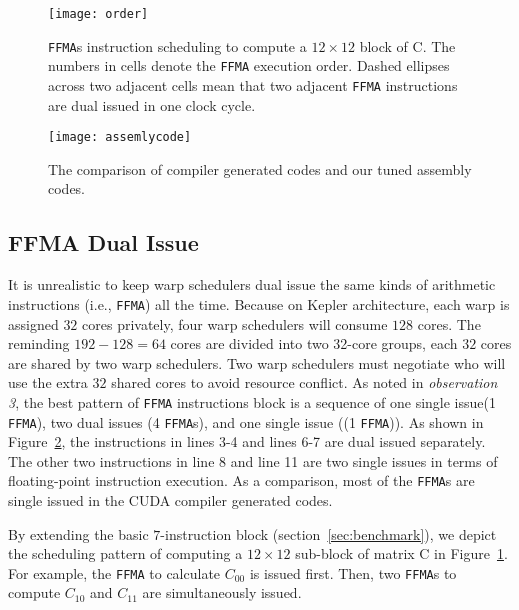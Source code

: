 \begin{figure}[htbp]
\begin{center}
\texttt{[image: order]}
\caption{\small {\tt FFMA}s instruction scheduling to compute a $12\times 12$ block of C.  The numbers in
cells denote the {\tt FFMA} execution order. Dashed ellipses across two adjacent cells mean that two adjacent {\tt FFMA} instructions are dual issued in one clock cycle.}
\label{fig:order}
\end{center}
\end{figure}

\begin{figure}[htbp]
\begin{center}
\texttt{[image: assemlycode]}
    \caption{\small The comparison of compiler generated codes and our tuned assembly codes.}
\label{fig:assemblycode}
\end{center}
\end{figure}
\subsection{FFMA Dual Issue}
\label{sec:ffma-dual}

It is unrealistic to keep warp schedulers dual issue the same kinds of arithmetic instructions (i.e., {\tt FFMA}) all
the time. Because on Kepler architecture, each warp is assigned $32$ cores privately, four warp schedulers will consume
$128$ cores. The reminding $192-128=64$ cores are divided into two 32-core groups, each $32$ cores
are shared by two warp schedulers. Two warp schedulers must negotiate who will use the extra $32$ shared cores to avoid
resource conflict.
As noted in {\em observation 3}, the best pattern of {\tt FFMA} instructions block is a sequence of one single issue(1
{\tt FFMA}), two dual issues (4 {\tt FFMA}s), and one single issue ((1 {\tt FFMA})). As shown in
Figure~\ref{fig:assemblycode}, the instructions in lines 3-4 and lines 6-7 are dual issued separately.
The other two instructions in line 8 and line 11 are two single issues in terms of floating-point instruction
execution.
As a comparison, most of the {\tt FFMA}s are single issued in the CUDA compiler generated codes.

By extending the basic $7$-instruction block (section~\ref{sec:benchmark}), we depict the scheduling pattern of computing a $12\times 12$ sub-block of matrix C in Figure~\ref{fig:order}.
For example, the {\tt FFMA} to calculate $C_{00}$ is issued first.
Then, two {\tt FFMA}s to
compute $C_{10}$ and $C_{11}$ are simultaneously issued. %

